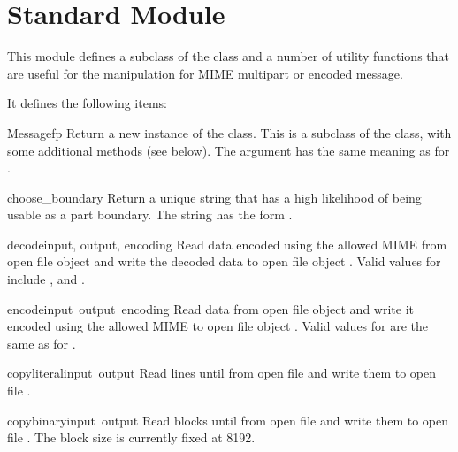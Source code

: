 \section{Standard Module }
\label{module-mimetools}


This module defines a subclass of the  class and
a number of utility functions that are useful for the manipulation for
MIME multipart or encoded message.

It defines the following items:

\begin{classdesc}{Message}{fp}
Return a new instance of the  class.  This is a
subclass of the  class, with some additional
methods (see below).  The  argument has the same meaning
as for .
\end{classdesc}

\begin{funcdesc}{choose_boundary}{}
Return a unique string that has a high likelihood of being usable as a
part boundary.  The string has the form
.
\end{funcdesc}

\begin{funcdesc}{decode}{input, output, encoding}
Read data encoded using the allowed MIME  from open file
object  and write the decoded data to open file object
.  Valid values for  include
,  and .
\end{funcdesc}

\begin{funcdesc}{encode}{input\, output\, encoding}
Read data from open file object  and write it encoded using
the allowed MIME  to open file object .
Valid values for  are the same as for .
\end{funcdesc}

\begin{funcdesc}{copyliteral}{input\, output}
Read lines until \EOF{} from open file  and write them to
open file .
\end{funcdesc}

\begin{funcdesc}{copybinary}{input\, output}
Read blocks until \EOF{} from open file  and write them to
open file .  The block size is currently fixed at 8192.
\end{funcdesc}


